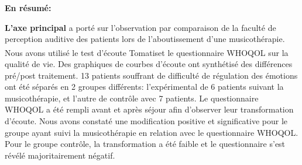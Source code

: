 


 
 
  





  
  \textbf{En résumé:} 
  
  \textbf{ L'axe principal}  a porté sur l'observation par comparaison de la faculté de 
  perception auditive 
  des patients lors de l'aboutissement d'une musicothérapie. Nous avons utilisé 
   le test d'écoute Tomatis\textsuperscript \textregistered   et le questionnaire WHOQOL sur la qualité de 
   vie.
  Des graphiques de courbes d'écoute ont synthétisé des différences pré/post traitement.
  13 patients souffrant de difficulté de régulation des émotions ont été séparés en 2 
  groupes différents: l'expérimental de 6 patients suivant la musicothérapie, et l'autre de
  contrôle avec 7 patients. Le questionnaire WHOQOL a été  rempli avant et 
  après séjour afin d'observer leur transformation d'écoute. %
  Nous avons constaté une modification positive et significative pour le groupe ayant 
  suivi la 
  musicothérapie en relation avec le questionnaire WHOQOL.
  Pour le groupe contrôle, la transformation a été faible et le questionnaire s'est révélé majoritairement 
  négatif.
  
